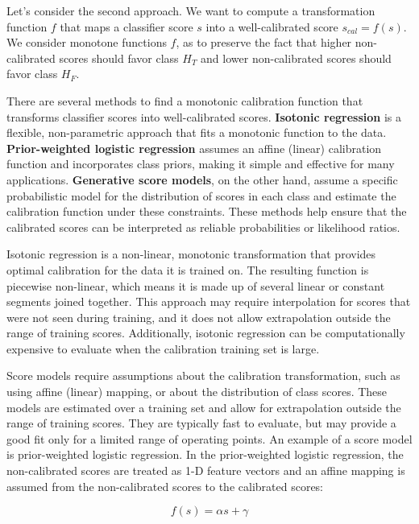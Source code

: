 Let's consider the second approach. We want to compute a transformation function $f$ that maps a classifier score $s$ into a well-calibrated score $s_{cal} = f(s)$. We consider monotone functions $f$, as to preserve the fact that higher non-calibrated scores should favor class $H_T$ and lower non-calibrated scores should favor class $H_F$.

There are several methods to find a monotonic calibration function that transforms classifier scores into well-calibrated scores. \textbf{Isotonic regression} is a flexible, non-parametric approach that fits a monotonic function to the data. \textbf{Prior-weighted logistic regression} assumes an affine (linear) calibration function and incorporates class priors, making it simple and effective for many applications. \textbf{Generative score models}, on the other hand, assume a specific probabilistic model for the distribution of scores in each class and estimate the calibration function under these constraints. These methods help ensure that the calibrated scores can be interpreted as reliable probabilities or likelihood ratios.

Isotonic regression is a non-linear, monotonic transformation that provides optimal calibration for the data it is trained on. The resulting function is piecewise non-linear, which means it is made up of several linear or constant segments joined together. This approach may require interpolation for scores that were not seen during training, and it does not allow extrapolation outside the range of training scores. Additionally, isotonic regression can be computationally expensive to evaluate when the calibration training set is large.

Score models require assumptions about the calibration transformation, such as using affine (linear) mapping, or about the distribution of class scores. These models are estimated over a training set and allow for extrapolation outside the range of training scores. They are typically fast to evaluate, but may provide a good fit only for a limited range of operating points. An example of a score model is prior-weighted logistic regression. In the prior-weighted logistic regression, the non-calibrated scores are treated as 1-D feature vectors and an affine mapping is assumed from the non-calibrated scores to the calibrated scores:

\begin{equation*}
f(s) = \alpha s + \gamma
\end{equation*}

